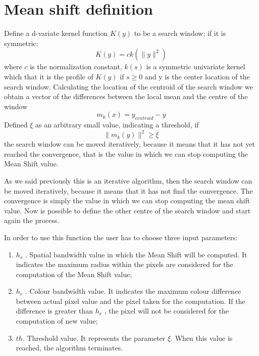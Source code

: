 \section{Mean shift definition}
Define a d-variate kernel function $K(y)$ to be a search window; if it is symmetric:
\begin{equation}
K(y)= ck(\|y\|^{2})
\end{equation}
where $c$ is the normalization constant, $k(s)$ is a symmetric univariate kernel which that it is the profile of $K(y)$ if $s \geq 0$ and y is the center location of the search window. Calculating the location of the centroid of the search window we obtain a vector of the differences between the local mean and the centre of the window
\begin{equation}
m_{k}{(x)}= y_{centroid} - y 
\end{equation} 
Defined $\xi$ as an arbitrary small value, indicating a threshold, if
\begin{equation}
\|m_{k}(y)\|^2 \geq \xi     
\end{equation}
the search window can be moved iteratively, because it means that it has not yet reached the convergence, that is the value in which we can stop computing the Mean Shift value.

\bigskip

As we said previously this is an iterative algorithm, then the search window can be moved iteratively, because it means that it has not find the convergence. The convergence is simply the value in which we can stop computing the mean shift value. Now is possible to define the other centre of the search window and start again the process.

\bigskip

In order to use this function the user has to choose three input parameters:
\begin{enumerate}
\item $h_{s}$ . Spatial bandwidth value in which the Mean Shift will be computed. It indicates the maximum radius within the pixels are considered for the computation of the Mean Shift value;

\item $h_{r}$  . Colour bandwidth value. It indicates the maximum colour difference between
actual pixel value and the pixel taken for the computation. If the difference is greater than $h_{r}$ , the pixel will not be considered for the computation of new value;

\item $th$. Threshold value. It represents the parameter $\xi$. When this value is reached, the algorithm terminates.
\end{enumerate}


